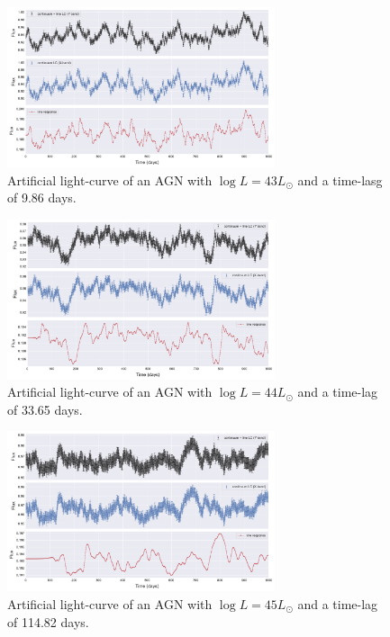 \documentclass[letterpaper, oneside]{article}
\begin{document}
\begin{figure}[h]
	\centering
	\includegraphics[width=0.7\textwidth]{../lc_plots/art_lcs_logL43.pdf}
	\caption{Artificial light-curve of an AGN with $\log L = 43 L_{\odot}$ and a time-lasg of 9.86 days.}
	\label{fig:art_lcs_L43}
\end{figure}

\begin{figure}[h]
	\centering
	\includegraphics[width=0.7\textwidth]{../lc_plots/art_lcs_logL44.pdf}
	\caption{Artificial light-curve of an AGN with $\log L = 44 L_{\odot}$ and a time-lag of 33.65 days.}
	\label{fig:art_lcs_L44}
\end{figure}

\begin{figure}[h]
	\centering
	\includegraphics[width=0.7\textwidth]{../lc_plots/art_lcs_logL45.pdf}
	\caption{Artificial light-curve of an AGN with $\log L = 45 L_{\odot}$ and a time-lag of 114.82 days.}
	\label{fig:art_lcs_L45}
\end{figure}
\end{document}
